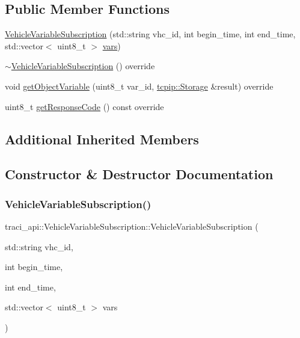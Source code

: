 \subsection*{Public Member Functions}
\begin{DoxyCompactItemize}
\item 
\hyperlink{classtraci__api_1_1_vehicle_variable_subscription_a74f923a4d91d07a7d48470fcc3d68d21}{Vehicle\+Variable\+Subscription} (std\+::string vhc\+\_\+id, int begin\+\_\+time, int end\+\_\+time, std\+::vector$<$ uint8\+\_\+t $>$ \hyperlink{classtraci__api_1_1_variable_subscription_a59bec6554debe2d14d75c29017561959}{vars})
\item 
\hyperlink{classtraci__api_1_1_vehicle_variable_subscription_aa397a66e0f060ddc9939de635b3dff64}{$\sim$\+Vehicle\+Variable\+Subscription} () override
\item 
void \hyperlink{classtraci__api_1_1_vehicle_variable_subscription_afaefff100368a747aefb8be29e8a7a91}{get\+Object\+Variable} (uint8\+\_\+t var\+\_\+id, \hyperlink{classtcpip_1_1_storage}{tcpip\+::\+Storage} \&result) override
\item 
uint8\+\_\+t \hyperlink{classtraci__api_1_1_vehicle_variable_subscription_a77ac472ae8dc1f284c2ec3f64b88cd0d}{get\+Response\+Code} () const override
\end{DoxyCompactItemize}
\subsection*{Additional Inherited Members}


\subsection{Constructor \& Destructor Documentation}
\mbox{\label{classtraci__api_1_1_vehicle_variable_subscription_a74f923a4d91d07a7d48470fcc3d68d21}} 
\subsubsection{\texorpdfstring{Vehicle\+Variable\+Subscription()}{VehicleVariableSubscription()}}
{\footnotesize\ttfamily traci\+\_\+api\+::\+Vehicle\+Variable\+Subscription\+::\+Vehicle\+Variable\+Subscription (\begin{DoxyParamCaption}\item[{std\+::string}]{vhc\+\_\+id,  }\item[{int}]{begin\+\_\+time,  }\item[{int}]{end\+\_\+time,  }\item[{std\+::vector$<$ uint8\+\_\+t $>$}]{vars }\end{DoxyParamCaption})\hspace{0.3cm}{\ttfamily [inline]}}

